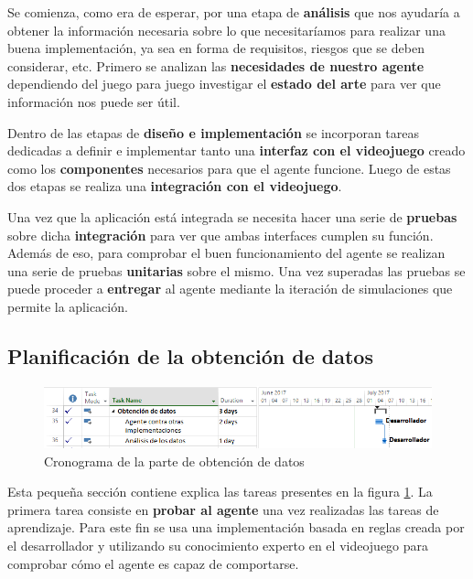 \bigskip

Se comienza, como era de esperar, por una etapa de \textbf{análisis} que nos ayudaría a obtener la información necesaria sobre lo que necesitaríamos para realizar una buena implementación, ya sea en forma de requisitos, riesgos que se deben considerar, etc. Primero se analizan las \textbf{necesidades de nuestro agente} dependiendo del juego para juego investigar el \textbf{estado del arte} para ver que información nos puede ser útil.

\bigskip

Dentro de las etapas de \textbf{diseño e implementación} se incorporan tareas dedicadas a definir e implementar tanto una \textbf{interfaz con el videojuego} creado como los \textbf{componentes} necesarios para que el agente funcione. Luego de estas dos etapas se realiza una \textbf{integración con el videojuego}.

\bigskip

Una vez que la aplicación está integrada se necesita hacer una serie de \textbf{pruebas} sobre dicha \textbf{integración} para ver que ambas interfaces cumplen su función. Además de eso, para comprobar el buen funcionamiento del agente se realizan una serie de pruebas \textbf{unitarias} sobre el mismo. Una vez superadas las pruebas se puede proceder a \textbf{entregar} al agente mediante la iteración de simulaciones que permite la aplicación.


\subsection{Planificación de la obtención de datos}

\begin{figure}
	\centerline{\includegraphics[width=19cm]{otros/capturasPlanificacion/obtencion_de_datos.PNG}}
	\caption{Cronograma de la parte de obtención de datos}
	\label{plan:datos}
\end{figure}


Esta pequeña sección contiene explica las tareas presentes en la figura \ref{plan:datos}. La primera tarea consiste en \textbf{probar al agente} una vez realizadas las tareas de aprendizaje. Para este fin se usa una implementación basada en reglas creada por el desarrollador y utilizando su conocimiento experto en el videojuego para comprobar cómo el agente es capaz de comportarse.


